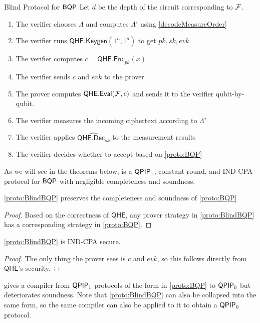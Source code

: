 \begin{protocol}{Blind Protocol for $\operatorname{\mathsf{BQP}}$}
	\label{proto:BlindBQP}
	Let $d$ be the depth of the circuit corresponding to $\mathcal{F}$.
	\begin{enumerate}
		\item The verifier chooses $\Lambda$ and computes $\Lambda'$ using \cref{decodeMeasureOrder}
		\item The verifier runs $\mathsf{QHE.Keygen}(1^n, 1^d)$ to get $pk, sk, evk$.
		\item The verifier computes $c=\mathsf{QHE.Enc}_{pk}(x)$
		\item The verifier sends $c$ and $evk$ to the prover
		\item The prover computes $\mathsf{QHE.Eval}(\mathcal{F}, c)$ and sends it to the verifier qubit-by-qubit.
		\item The verifier measures the incoming ciphertext according to $\Lambda'$
		\item The verifier applies $\widehat{\mathsf{QHE.Dec}_{sk}}$ to the measurement results
		\item The verifier decides whether to accept based on \cref{proto:BQP}
	\end{enumerate}
\end{protocol}

As we will see in the theorems below,  is a $\operatorname{\mathsf{QPIP}}_1$, constant round, and IND-CPA protocol for $\operatorname{\mathsf{BQP}}$ with negligible completeness and soundness.

\begin{thm}
	\cref{proto:BlindBQP} preserves the completeness and soundness of \cref{proto:BQP}
\end{thm}
\begin{proof}
	Based on the correctness of $\mathsf{QHE}$, any prover strategy in \cref{proto:BlindBQP} has a corresponding strategy in \cref{proto:BQP}.
\end{proof}

\begin{thm}
	\cref{proto:BlindBQP} is IND-CPA secure.
\end{thm}
\begin{proof}
	The only thing the prover sees is $c$ and $evk$, so this follows directly from $\mathsf{QHE}$'s security.
\end{proof}

\cite{mahadev_delegation} gives a compiler from $\operatorname{\mathsf{QPIP}}_1$ protocols of the form in \cref{proto:BQP} to $\operatorname{\mathsf{QPIP}}_0$ but deteriorates soundness.
Note that \cref{proto:BlindBQP} can also be collapsed into the same form, so the same compiler can also be applied to it to obtain a $\operatorname{\mathsf{QPIP}}_0$ protocol.


